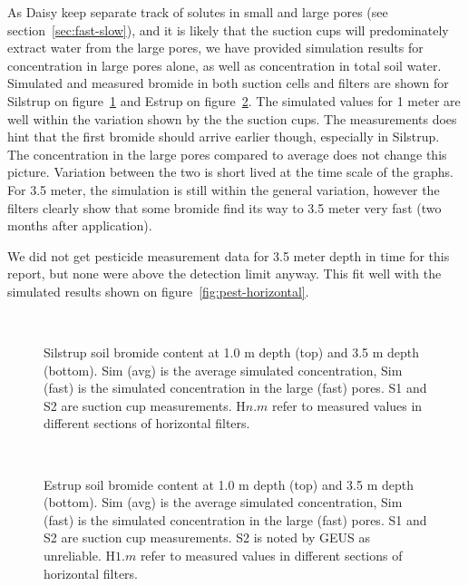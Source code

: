 As Daisy keep separate track of solutes in small and large pores (see
section~\ref{sec:fast-slow}), and it is likely that the suction cups
will predominately extract water from the large pores, we have
provided simulation results for concentration in large pores alone, as
well as concentration in total soil water.  Simulated and measured
bromide in both suction cells and filters are shown for Silstrup on
figure~\ref{fig:Silstrup-bromide} and Estrup on
figure~\ref{fig:Estrup-bromide}.  The simulated values for 1 meter are
well within the variation shown by the the suction cups.  The
measurements does hint that the first bromide should arrive earlier
though, especially in Silstrup.  The concentration in the large pores
compared to average does not change this picture.  Variation between
the two is short lived at the time scale of the graphs.  For 3.5
meter, the simulation is still within the general variation, however
the filters clearly show that some bromide find its way to 3.5 meter
very fast (two months after application).

We did not get pesticide measurement data for 3.5 meter depth in time
for this report, but none were above the detection limit anyway.  This
fit well with the simulated results shown on
figure~\ref{fig:pest-horizontal}.

\begin{figure}[htbp]
  \begin{center}
    \\
  \end{center}
  \caption{Silstrup soil bromide content at 1.0 m depth (top) and 3.5
    m depth (bottom).  Sim (avg) is the average simulated
    concentration, Sim (fast) is the simulated concentration in the
    large (fast) pores.  S1 and S2 are suction cup measurements.
    H$n$.$m$ refer to measured values in different sections of
    horizontal filters.}
  \label{fig:Silstrup-bromide}
\end{figure}

\begin{figure}[htbp]
  \begin{center}
    \\
  \end{center}
  \caption{Estrup soil bromide content at 1.0 m depth (top) and 3.5 m
    depth (bottom).  Sim (avg) is the average simulated concentration,
    Sim (fast) is the simulated concentration in the large (fast)
    pores.  S1 and S2 are suction cup measurements.  S2 is noted by
    GEUS as unreliable.  H$1$.$m$ refer to measured values in
    different sections of horizontal filters.}
  \label{fig:Estrup-bromide}
\end{figure}

